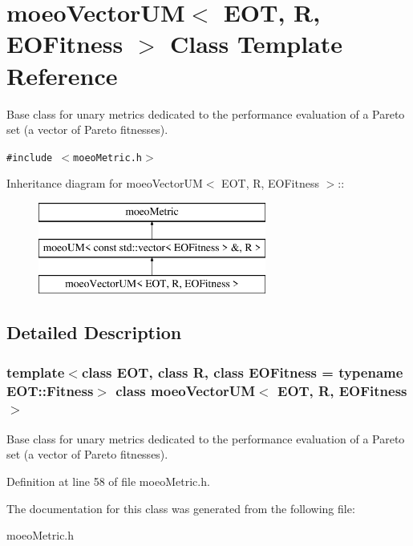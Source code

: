 \section{moeo\-Vector\-UM$<$ EOT, R, EOFitness $>$ Class Template Reference}
\label{classmoeoVectorUM}
Base class for unary metrics dedicated to the performance evaluation of a Pareto set (a vector of Pareto fitnesses).  


{\tt \#include $<$moeo\-Metric.h$>$}

Inheritance diagram for moeo\-Vector\-UM$<$ EOT, R, EOFitness $>$::\begin{figure}[H]
\begin{center}
\leavevmode
\includegraphics[height=3cm]{classmoeoVectorUM}
\end{center}
\end{figure}


\subsection{Detailed Description}
\subsubsection*{template$<$class EOT, class R, class EOFitness = typename EOT::Fitness$>$ class moeo\-Vector\-UM$<$ EOT, R, EOFitness $>$}

Base class for unary metrics dedicated to the performance evaluation of a Pareto set (a vector of Pareto fitnesses). 



Definition at line 58 of file moeo\-Metric.h.

The documentation for this class was generated from the following file:\begin{CompactItemize}
\item 
moeo\-Metric.h\end{CompactItemize}
